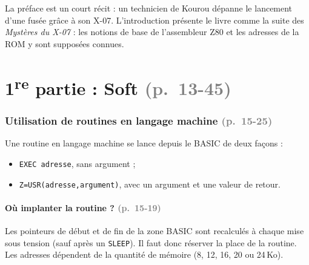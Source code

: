 \documentclass[a4paper,10pt]{article}
\newcommand{\pg}[1]{\texorpdfstring{\textcolor{gray}{\small(p.~#1)}}{}}
\begin{document}
La préface est un court récit : un technicien de Kourou dépanne le lancement
d'une fusée grâce à son X-07. L'introduction présente le livre comme la suite
des \emph{Mystères du X-07} : les notions de base de l'assembleur Z80 et les
adresses de la ROM y sont supposées connues.

\part*{1\textsuperscript{re} partie : Soft \pg{13-45}}

\section{Utilisation de routines en langage machine \pg{15-25}}

Une routine en langage machine se lance depuis le BASIC de deux façons :
\begin{itemize}
  \item \texttt{EXEC adresse}, sans argument ;
  \item \texttt{Z=USR(adresse,argument)}, avec un argument et une valeur de
        retour.
\end{itemize}

\subsection{Où implanter la routine ? \pg{15-19}}

Les pointeurs de début et de fin de la zone BASIC sont recalculés à chaque
mise sous tension (sauf après un \texttt{SLEEP}). Il faut donc réserver la
place de la routine. Les adresses dépendent de la quantité de mémoire
(8, 12, 16, 20 ou 24\,Ko).
\end{document}
